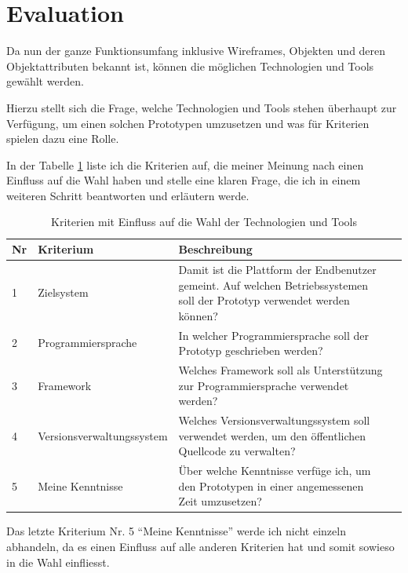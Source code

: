 \section{Evaluation}
Da nun der ganze Funktionsumfang inklusive Wireframes, Objekten und deren
Objektattributen bekannt ist, können die möglichen Technologien und Tools
gewählt werden.

Hierzu stellt sich die Frage, welche Technologien und Tools stehen überhaupt
zur Verfügung, um einen solchen Prototypen umzusetzen und was für Kriterien spielen
dazu eine Rolle.

In der Tabelle \ref{tab:umsetzungskriterien} liste ich die Kriterien auf, die
meiner Meinung nach einen Einfluss auf die Wahl haben und stelle eine klaren 
Frage, die ich in einem weiteren Schritt beantworten und erläutern werde.

\begin{table}[h]
\begin{center}
    \begin{tabular}{llp{9cm}l}
        \toprule Nr & Kriterium & Beschreibung \\
        \midrule 1 & Zielsystem & Damit ist die Plattform der Endbenutzer
                 gemeint. Auf welchen Betriebssystemen soll der Prototyp 
                 verwendet werden können? \\
        \midrule 2 & Programmiersprache & In welcher Programmiersprache soll
                 der Prototyp geschrieben werden? \\
        \midrule 3 & Framework & Welches Framework soll als Unterstützung zur
                 Programmiersprache verwendet werden? \\
        \midrule 4 & Versionsverwaltungssystem & Welches Versionsverwaltungssystem soll
                 verwendet werden, um den öffentlichen Quellcode zu verwalten? \\
        \midrule 5 & Meine Kenntnisse & Über welche Kenntnisse verfüge ich, um
                 den Prototypen in einer angemessenen Zeit umzusetzen? \\
        \bottomrule
    \end{tabular}
    \caption{Kriterien mit Einfluss auf die Wahl der Technologien und Tools}
    \label{tab:umsetzungskriterien}
\end{center}
\end{table}

Das letzte Kriterium Nr. 5 ``Meine Kenntnisse'' werde ich nicht einzeln abhandeln,
da es einen Einfluss auf alle anderen Kriterien hat und somit sowieso in die Wahl
einfliesst.

